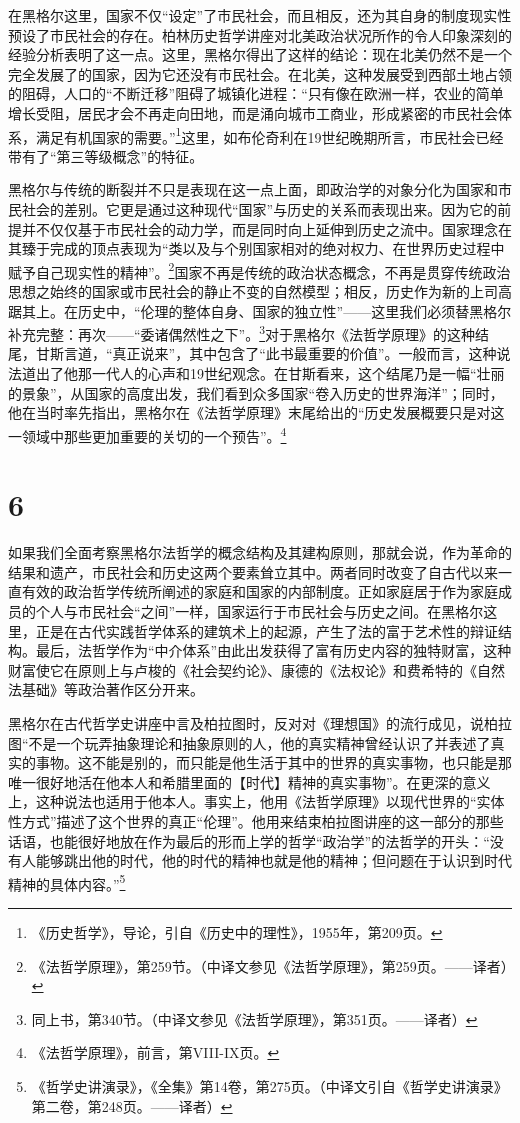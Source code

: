 在黑格尔这里，国家不仅“设定”了市民社会，而且相反，还为其自身的制度现实性预设了市民社会的存在。柏林历史哲学讲座对北美政治状况所作的令人印象深刻的经验分析表明了这一点。这里，黑格尔得出了这样的结论：现在北美仍然不是一个完全发展了的国家，因为它还没有市民社会。在北美，这种发展受到西部土地占领的阻碍，人口的“不断迁移”阻碍了城镇化进程：“只有像在欧洲一样，农业的简单增长受阻，居民才会不再走向田地，而是涌向城市工商业，形成紧密的市民社会体系，满足有机国家的需要。”\footnote{《历史哲学》，导论，引自《历史中的理性》，1955年，第209页。}这里，如布伦奇利在19世纪晚期所言，市民社会已经带有了“第三等级概念”的特征。

黑格尔与传统的断裂并不只是表现在这一点上面，即政治学的对象分化为国家和市民社会的差别。它更是通过这种现代“国家”与历史的关系而表现出来。因为它的前提并不仅仅基于市民社会的动力学，而是同时向上延伸到历史之流中。国家理念在其臻于完成的顶点表现为“类以及与个别国家相对的绝对权力、在世界历史过程中赋予自己现实性的精神”。\footnote{《法哲学原理》，第259节。（中译文参见《法哲学原理》，第259页。——译者）}国家不再是传统的政治状态概念，不再是贯穿传统政治思想之始终的国家或市民社会的静止不变的自然模型；相反，历史作为新的上司高踞其上。在历史中，“伦理的整体自身、国家的独立性”——这里我们必须替黑格尔补充完整：再次——“委诸偶然性之下”。\footnote{同上书，第340节。（中译文参见《法哲学原理》，第351页。——译者）}对于黑格尔《法哲学原理》的这种结尾，甘斯言道，“真正说来”，其中包含了“此书最重要的价值”。一般而言，这种说法道出了他那一代人的心声和19世纪观念。在甘斯看来，这个结尾乃是一幅“壮丽的景象”，从国家的高度出发，我们看到众多国家“卷入历史的世界海洋”；同时，他在当时率先指出，黑格尔在《法哲学原理》末尾给出的“历史发展概要只是对这一领域中那些更加重要的关切的一个预告”。\footnote{《法哲学原理》，前言，第VIII-IX页。}

\section*{6}

如果我们全面考察黑格尔法哲学的概念结构及其建构原则，那就会说，作为革命的结果和遗产，市民社会和历史这两个要素耸立其中。两者同时改变了自古代以来一直有效的政治哲学传统所阐述的家庭和国家的内部制度。正如家庭居于作为家庭成员的个人与市民社会“之间”一样，国家运行于市民社会与历史之间。在黑格尔这里，正是在古代实践哲学体系的建筑术上的起源，产生了法的富于艺术性的辩证结构。最后，法哲学作为“中介体系”由此出发获得了富有历史内容的独特财富，这种财富使它在原则上与卢梭的《社会契约论》、康德的《法权论》和费希特的《自然法基础》等政治著作区分开来。

黑格尔在古代哲学史讲座中言及柏拉图时，反对对《理想国》的流行成见，说柏拉图“不是一个玩弄抽象理论和抽象原则的人，他的真实精神曾经认识了并表述了真实的事物。这不能是别的，而只能是他生活于其中的世界的真实事物，也只能是那唯一很好地活在他本人和希腊里面的【时代】精神的真实事物”。在更深的意义上，这种说法也适用于他本人。事实上，他用《法哲学原理》以现代世界的“实体性方式”描述了这个世界的真正“伦理”。他用来结束柏拉图讲座的这一部分的那些话语，也能很好地放在作为最后的形而上学的哲学“政治学”的法哲学的开头：“没有人能够跳出他的时代，他的时代的精神也就是他的精神；但问题在于认识到时代精神的具体内容。”\footnote{《哲学史讲演录》，《全集》第14卷，第275页。（中译文引自《哲学史讲演录》第二卷，第248页。——译者）}